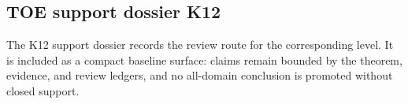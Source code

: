 \subsection{TOE support dossier K12}
The K12 support dossier records the review route for the corresponding level. It is included as a compact baseline surface: claims remain bounded by the theorem, evidence, and review ledgers, and no all-domain conclusion is promoted without closed support.
